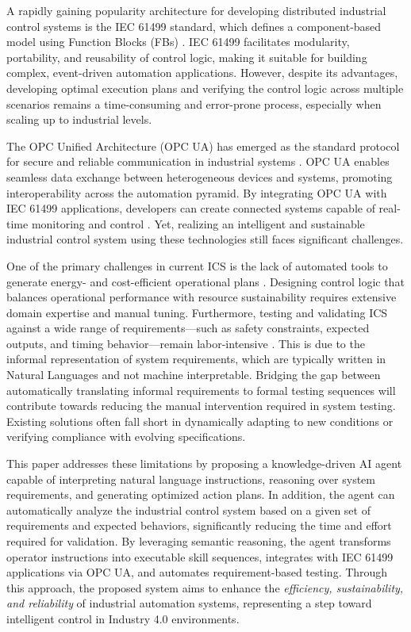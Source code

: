 \begin{bibunit}
    A rapidly gaining popularity architecture for developing distributed industrial control systems is the IEC 61499 standard, which defines a component-based model using Function Blocks (FBs) \cite{iec61499part12012}. IEC 61499 facilitates modularity, portability, and reusability of control logic, making it suitable for building complex, event-driven automation applications. However, despite its advantages, developing optimal execution plans and verifying the control logic across multiple scenarios remains a time-consuming and error-prone process, especially when scaling up to industrial levels.
    
    The OPC Unified Architecture (OPC UA) has emerged as the standard protocol for secure and reliable communication in industrial systems \cite{OPC_UA_2023}. OPC UA enables seamless data exchange between heterogeneous devices and systems, promoting interoperability across the automation pyramid. By integrating OPC UA with IEC 61499 applications, developers can create connected systems capable of real-time monitoring and control \cite{majumder2023proposal}. Yet, realizing an intelligent and sustainable industrial control system using these technologies still faces significant challenges.
    
    One of the primary challenges in current ICS is the lack of automated tools to generate energy- and cost-efficient operational plans \cite{benedetti2017energy}. Designing control logic that balances operational performance with resource sustainability requires extensive domain expertise and manual tuning. Furthermore, testing and validating ICS against a wide range of requirements---such as safety constraints, expected outputs, and timing behavior---remain labor-intensive \cite{antao2018requirements}. This is due to the informal representation of system requirements, which are typically written in Natural Languages and not machine interpretable. Bridging the gap between automatically translating informal requirements to formal testing sequences will contribute towards reducing the manual intervention required in system testing. Existing solutions often fall short in dynamically adapting to new conditions or verifying compliance with evolving specifications.
    
    This paper addresses these limitations by proposing a knowledge-driven AI agent capable of interpreting natural language instructions, reasoning over system requirements, and generating optimized action plans. In addition, the agent can automatically analyze the industrial control system based on a given set of requirements and expected behaviors, significantly reducing the time and effort required for validation. By leveraging semantic reasoning, the agent transforms operator instructions into executable skill sequences, integrates with IEC 61499 applications via OPC UA, and automates requirement-based testing. Through this approach, the proposed system aims to enhance the \textit{efficiency, sustainability, and reliability} of industrial automation systems, representing a step toward intelligent control in Industry 4.0 environments.
    

\end{bibunit}
